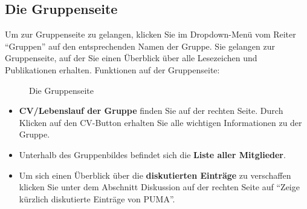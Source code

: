 \subsection{Die Gruppenseite}
\label{subsec:gruppenseite}
Um zur Gruppenseite zu gelangen, klicken Sie im Dropdown-Menü vom Reiter  \enquote{Gruppen} auf den entsprechenden Namen der Gruppe. Sie gelangen zur Gruppenseite, auf der Sie einen Überblick über alle Lesezeichen und Publikationen erhalten.%
\newline\newline
Funktionen auf der Gruppenseite:
\begin{figure}[h!]
 \centering
 \caption{Die Gruppenseite}
 \label{fig:gruppenseite}
\end{figure}
\begin{itemize}
\item \textbf{CV/Lebenslauf der Gruppe} finden Sie auf der rechten Seite. Durch Klicken auf den CV-Button erhalten Sie alle wichtigen Informationen zu der Gruppe.
\item Unterhalb des Gruppenbildes befindet sich die \textbf{Liste aller Mitglieder}. 
\item Um sich einen Überblick über die \textbf{diskutierten Einträge} zu verschaffen klicken Sie unter dem Abschnitt Diskussion auf der rechten Seite auf \enquote{Zeige kürzlich diskutierte Einträge von PUMA}. 
\end{itemize}
 
